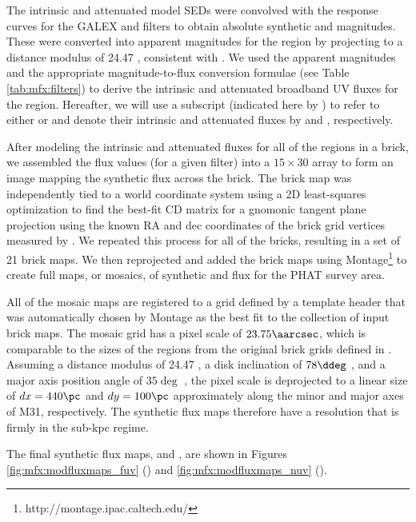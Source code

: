 The intrinsic and attenuated model SEDs were convolved with the response curves
for the GALEX \fuv{} and \nuv{} filters to obtain absolute synthetic \fuv{} and
\nuv{} magnitudes. These were converted into apparent magnitudes for the region
by projecting to a distance modulus of 24.47 \citep{McConnachie:2005},
consistent with \citet{Lewis:2014}. We used the apparent magnitudes and the
appropriate magnitude-to-flux conversion formulae (see Table
\ref{tab:mfx:filters}) to derive the intrinsic and attenuated broadband UV
fluxes for the region. Hereafter, we will use a subscript (indicated here by
\filter{}) to refer to either \fuv{} or \nuv{} and denote their intrinsic and
attenuated fluxes by \fxsfhz{} and \fxsfh{}, respectively.





After modeling the intrinsic and attenuated fluxes for all of the regions in a
brick, we assembled the flux values (for a given filter) into a $15 \times 30$
array to form an image mapping the synthetic flux across the brick. The brick
map was independently tied to a world coordinate system using a 2D
least-squares optimization to find the best-fit CD matrix
\citep{Calabretta:2002} for a gnomonic tangent plane projection using the known
RA and dec coordinates of the brick grid vertices measured by
\citet{Lewis:2014}. We repeated this process for all of the \citet{Lewis:2014}
bricks, resulting in a set of 21 brick maps. We then reprojected and added the
brick maps using Montage\footnote{http://montage.ipac.caltech.edu/} to create
full maps, or mosaics, of synthetic \fuv{} and \nuv{} flux for the PHAT survey
area.

All of the mosaic maps are registered to a grid defined by a template header
that was automatically chosen by Montage as the best fit to the collection of
input brick maps. The mosaic grid has a pixel scale of $23.75\aarcsec$, which
is comparable to the sizes of the regions from the original brick grids defined
in \citet{Lewis:2014}. Assuming a distance modulus of 24.47
\citep{McConnachie:2005}, a disk inclination of $78\ddeg$ \citep{Tully:1994},
and a major axis position angle of $35\deg$ \citep{deVaucouleurs:1995}, the
pixel scale is deprojected to a linear size of $dx = 440\pc$ and $dy = 100\pc$
approximately along the minor and major axes of M31, respectively. The
synthetic flux maps therefore have a resolution that is firmly in the sub-kpc
regime.

The final synthetic flux maps, \fxsfhz{} and \fxsfh{}, are shown in Figures
\ref{fig:mfx:modfluxmaps_fuv} (\fuv{}) and \ref{fig:mfx:modfluxmaps_nuv}
(\nuv{}).

